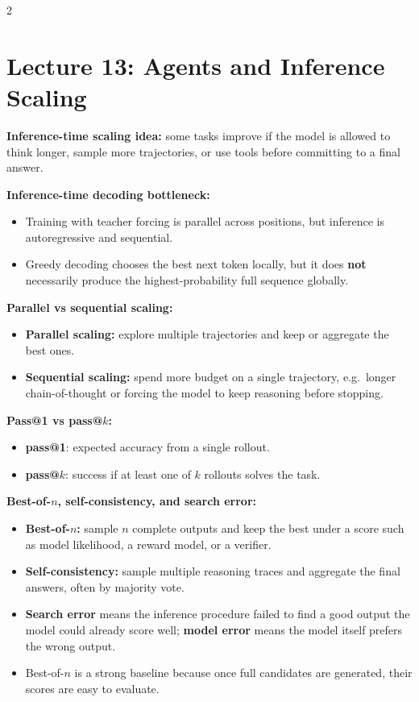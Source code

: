 \documentclass[10pt]{article}
\begin{document}
\begin{multicols*}{2}
\section*{Lecture 13: Agents and Inference Scaling}
\textbf{Inference-time scaling idea:}
some tasks improve if the model is allowed to think longer, sample more trajectories, or use tools before committing to a final answer.

\textbf{Inference-time decoding bottleneck:}
\begin{itemize}
\item Training with teacher forcing is parallel across positions, but inference is autoregressive and sequential.
\item Greedy decoding chooses the best next token locally, but it does \textbf{not} necessarily produce the highest-probability full sequence globally.
\end{itemize}

\textbf{Parallel vs sequential scaling:}
\begin{itemize}
\item \textbf{Parallel scaling:} explore multiple trajectories and keep or aggregate the best ones.
\item \textbf{Sequential scaling:} spend more budget on a single trajectory, e.g.\ longer chain-of-thought or forcing the model to keep reasoning before stopping.
\end{itemize}

\textbf{Pass@1 vs pass@\(k\):}
\begin{itemize}
\item \textbf{pass@1}: expected accuracy from a single rollout.
\item \textbf{pass@\(k\)}: success if at least one of \(k\) rollouts solves the task.
\end{itemize}

\textbf{Best-of-\(n\), self-consistency, and search error:}
\begin{itemize}
\item \textbf{Best-of-\(n\):} sample \(n\) complete outputs and keep the best under a score such as model likelihood, a reward model, or a verifier.
\item \textbf{Self-consistency:} sample multiple reasoning traces and aggregate the final answers, often by majority vote.
\item \textbf{Search error} means the inference procedure failed to find a good output the model could already score well; \textbf{model error} means the model itself prefers the wrong output.
\item Best-of-\(n\) is a strong baseline because once full candidates are generated, their scores are easy to evaluate.
\end{itemize}


\end{multicols*}
\end{document}

